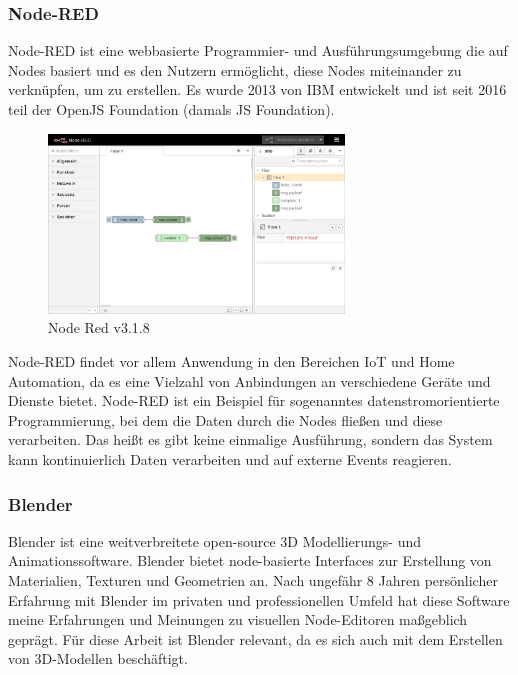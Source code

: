 \documentclass[ngerman]{article}
\begin{document}
\subsubsection{Node-RED}

Node-RED ist eine webbasierte Programmier- und Ausführungsumgebung die auf Nodes basiert und es den Nutzern ermöglicht, diese Nodes miteinander zu verknüpfen, um  zu erstellen. 
Es wurde 2013 von IBM entwickelt und ist seit 2016 teil der OpenJS Foundation (damals JS Foundation).
\cite{nodered}

\begin{figure}[htbp]
  \centering
  \includegraphics[width=0.7\textwidth]{./graphics/node-red-3_1_8.png}
  \caption{Node Red v3.1.8}
  \label{fig:node_red}
\end{figure}

Node-RED findet vor allem Anwendung in den Bereichen IoT und Home Automation, da es eine Vielzahl von Anbindungen an verschiedene Geräte und Dienste bietet. 
Node-RED ist ein Beispiel für sogenanntes datenstromorientierte Programmierung, bei dem die Daten durch die Nodes fließen und diese verarbeiten. Das heißt es gibt keine einmalige Ausführung, sondern das System kann kontinuierlich Daten verarbeiten und auf externe Events reagieren.

\pagebreak
\subsubsection{Blender}
Blender ist eine weitverbreitete open-source 3D Modellierungs- und Animationssoftware. Blender bietet node-basierte Interfaces zur Erstellung von Materialien, Texturen und Geometrien an. 
\cite{blender}
Nach ungefähr 8 Jahren persönlicher Erfahrung mit Blender im privaten und professionellen Umfeld hat diese Software meine Erfahrungen und Meinungen zu visuellen Node-Editoren maßgeblich geprägt.
Für diese Arbeit ist Blender relevant, da es sich auch mit dem Erstellen von 3D-Modellen beschäftigt.
\end{document}
